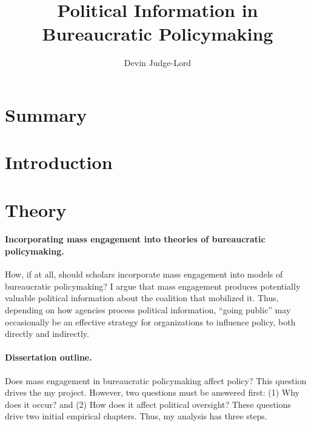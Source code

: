 \documentclass{article}
\title{Political Information in Bureaucratic Policymaking}
\author{Devin Judge-Lord} %
\begin{document}
\maketitle
\abstract{}
\doublespace










\newpage
\tableofcontents

\newpage
\section*{Summary}


\newpage
\section{Introduction} \label{intro}


\section{Theory} 
\paragraph{Incorporating mass engagement into theories of bureaucratic policymaking.}
How, if at all, should scholars incorporate mass engagement into models of bureaucratic policymaking? 
I argue that mass engagement produces potentially valuable political information about the coalition that mobilized it.
Thus, depending on how agencies process political information, ``going public'' may occasionally be an effective strategy for organizations to influence policy, both directly and indirectly.

\paragraph{Dissertation outline.}
Does mass engagement in bureaucratic policymaking affect policy? This question drives the my project. However, two questions must be answered first: (1) Why does it occur? and (2) How does it affect political oversight? These questions drive two initial empirical chapters. Thus, my analysis has three steps.
\end{document}

